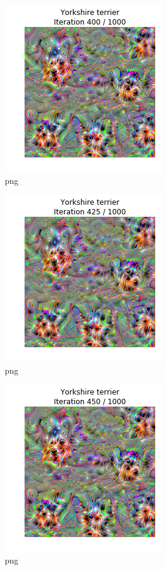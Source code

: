 \documentclass[]{book}
\theoremstyle{definition}
\theoremstyle{definition}
\theoremstyle{definition}
\theoremstyle{remark}
\begin{document}
\begin{figure}
\centering
\includegraphics{Network-Visualization-TensorFlow_files/Network-Visualization-TensorFlow_24_17.png}
\caption{png}
\end{figure}

\begin{figure}
\centering
\includegraphics{Network-Visualization-TensorFlow_files/Network-Visualization-TensorFlow_24_18.png}
\caption{png}
\end{figure}

\begin{figure}
\centering
\includegraphics{Network-Visualization-TensorFlow_files/Network-Visualization-TensorFlow_24_19.png}
\caption{png}
\end{figure}
\end{document}
